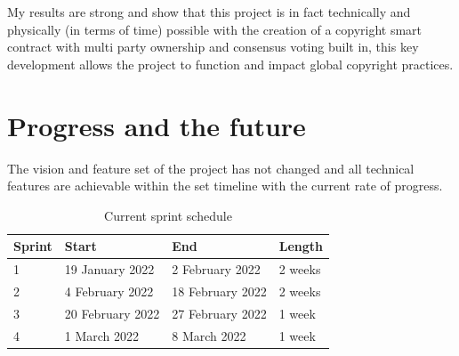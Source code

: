 \documentclass[12pt]{report}
\begin{document}
My results are strong and show that this project is in fact technically and physically (in terms of time) possible with the creation of a copyright smart contract with multi party ownership and consensus voting built in, this key development allows the project to function and impact global copyright practices.

\chapter{Progress and the future}

The vision and feature set of the project has not changed and all technical features are achievable within the set timeline with the current rate of progress. 

\begin{table}[h!]
\caption{Current sprint schedule}
\begin{tabular}{|l|l|l|l|}
\hline
Sprint & Start            & End              & Length  \\ \hline
1      & 19 January 2022  & 2 February 2022  & 2 weeks \\ \hline
2      & 4 February 2022  & 18 February 2022 & 2 weeks \\ \hline
3      & 20 February 2022 & 27 February 2022 & 1 week  \\ \hline
4      & 1 March 2022     & 8 March 2022     & 1 week  \\ \hline
\end{tabular}
\end{table}



\end{document}
